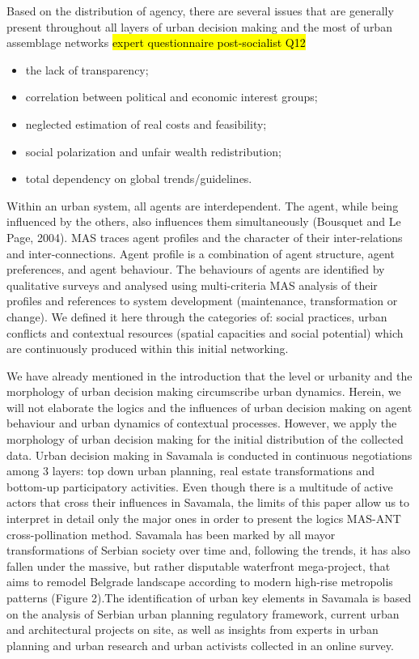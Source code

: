 \documentclass[11pt]{report}
\begin{document}

Based on the distribution of agency, there are several issues that are generally present throughout all layers of urban decision making and the most of urban assemblage networks \hl{expert questionnaire post-socialist Q12}
\begin{itemize}
\item the lack of transparency;
\item correlation between political and economic interest groups;
\item neglected estimation of real costs and feasibility;
\item social polarization and unfair wealth redistribution;
\item total dependency on global trends/guidelines.
\end{itemize}

Within an urban system, all agents are interdependent. The agent, while being influenced by the others, also influences them simultaneously (Bousquet and Le Page, 2004). MAS traces agent profiles and the character of their inter-relations and inter-connections. Agent profile is a combination of agent structure, agent preferences, and agent behaviour. The behaviours of agents are identified by qualitative surveys and analysed using multi-criteria MAS analysis of their profiles and references to system development (maintenance, transformation or change). We defined it here through the categories of: social practices, urban conflicts and contextual resources (spatial capacities and social potential) which are continuously produced within this initial networking.

We have already mentioned in the introduction that the level or urbanity and the morphology of urban decision making circumscribe urban dynamics. Herein, we will not elaborate the logics and the influences of urban decision making on agent behaviour and urban dynamics of contextual processes. However, we apply the morphology of urban decision making for the initial distribution of the collected data. Urban decision making in Savamala is conducted in continuous negotiations among 3 layers: top down urban planning, real estate transformations and bottom-up participatory activities. Even though there is a multitude of active actors that cross their influences in Savamala, the limits of this paper allow us to interpret in detail only the major ones in order to present the logics MAS-ANT cross-pollination method. Savamala has been marked by all mayor transformations of Serbian society over time and, following the trends, it has also fallen under the massive, but rather disputable waterfront mega-project, that aims to remodel Belgrade landscape according to modern high-rise metropolis patterns (Figure 2).The identification of urban key elements in Savamala is based on the analysis of Serbian urban planning regulatory framework, current urban and architectural projects on site, as well as insights from experts in urban planning and urban research and urban activists collected in an online survey.
\end{document}
